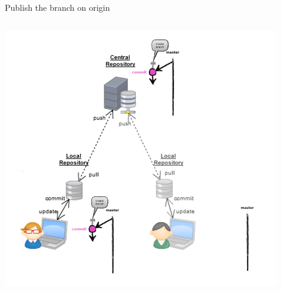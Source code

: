 \begin{frame}[fragile]{Publish the branch on origin}
\begin{columns}
\begin{column}{0.4\textwidth}
\begin{center}
{			}\only<3> {
				\includegraphics[width=0.9\textwidth]{multiuser_push_branch.png}
			}
		\end{center}
	\end{column}
\end{columns}
\end{frame}

